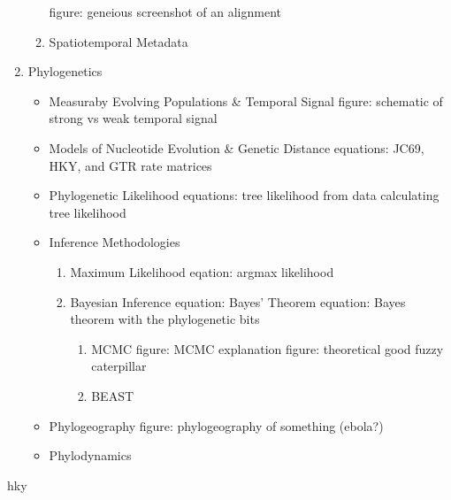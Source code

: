 \begin{enumerate}
\begin{enumerate}
    \subitem figure: geneious screenshot of an alignment
    \item Spatiotemporal Metadata
  \end{enumerate}
  \item Phylogenetics
  \begin{itemize}
    \item Measuraby Evolving Populations \& Temporal Signal
    \subitem figure: schematic of strong vs weak temporal signal
    \item Models of Nucleotide Evolution \& Genetic Distance
    \subitem equations: JC69, HKY, and GTR rate matrices
    \item Phylogenetic Likelihood
    \subitem equations: tree likelihood from data
    \subitem calculating tree likelihood
    \item Inference Methodologies
    \begin{enumerate}
      \item Maximum Likelihood
      \subitem eqation: argmax likelihood
      \item Bayesian Inference
      \subitem equation: Bayes' Theorem
      \subitem equation: Bayes theorem with the phylogenetic bits
      \begin{enumerate}
        \item MCMC
        \subitem figure: MCMC explanation
        \subitem figure: theoretical good fuzzy caterpillar
        \item BEAST
      \end{enumerate}
    \end{enumerate}
    \item Phylogeography
    \subitem figure: phylogeography of something (ebola?)
    \item Phylodynamics
  \end{itemize}
\end{enumerate}

\gls{hky}

